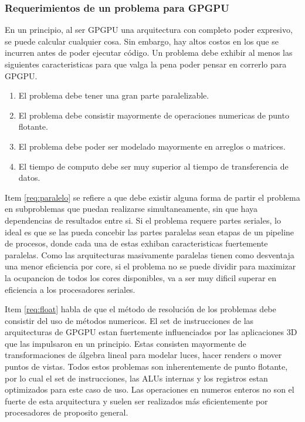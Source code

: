 \subsubsection{Requerimientos de un problema para GPGPU}
En un principio, al ser GPGPU una arquitectura con completo poder expresivo, se puede
calcular cualquier cosa. Sin embargo, hay altos costos en los que se incurren antes de
poder ejecutar c\'odigo. Un problema debe exhibir al menos las siguientes caracteristicas
para que valga la pena poder pensar en correrlo para GPGPU.
\begin{enumerate}
  \item \label{req:paralelo} El problema debe tener una gran parte paralelizable.
  \item \label{req:float} El problema debe consistir mayormente de operaciones numericas de punto flotante.
  \item \label{req:matrix} El problema debe poder ser modelado mayormente en arreglos o matrices.
  \item \label{req:transf} El tiempo de computo debe ser muy superior al tiempo de transferencia de datos.
\end{enumerate}

Item \ref{req:paralelo} se refiere a que debe existir alguna forma de partir el problema
en subproblemas que puedan realizarse simultaneamente, sin que haya dependencias de
resultados entre si. Si el problema requere partes seriales, lo ideal es que se las
pueda concebir las partes paralelas sean etapas de un pipeline de procesos, donde
cada una de estas exhiban caracteristicas fuertemente paralelas. Como las arquitecturas
masivamente paralelas tienen como desventaja una menor eficiencia por core, si el
problema no se puede dividir para maximizar la ocupancion de todos los cores disponibles,
va a ser muy dificil superar en eficiencia a los procesadores seriales.

Item \ref{req:float} habla de que el m\'etodo de resoluci\'on de los problemas debe
consistir del uso de m\'etodos numericos. El set de instrucciones de las arquitecturas
de GPGPU estan fuertemente influenciados por las aplicaciones 3D que las impulsaron
en un principio. Estas consisten mayormente de transformaciones de \'algebra lineal
para modelar luces, hacer renders o mover puntos de vistas. Todos estos problemas
son inherentemente de punto flotante, por lo cual el set de instrucciones, las ALUs
internas y los registros estan optimizados para este caso de uso. Las operaciones
en numeros enteros no son el fuerte de esta arquitectura y suelen ser realizados
m\'as eficientemente por procesadores de proposito general.

